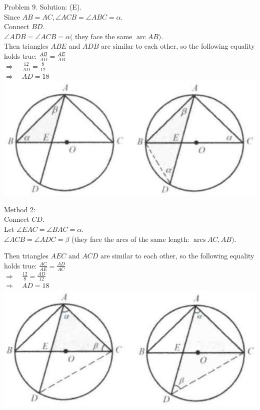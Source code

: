 \documentclass[10pt]{article}
\begin{document}
Problem 9. Solution: (E).\\
Since \(A B=A C, \angle A C B=\angle A B C=\alpha\).\\
Connect \(B D\).\\
\(\angle A D B=\angle A C B=\alpha(\) they face the same \(\operatorname{arc} A B)\).\\
Then triangles \(A B E\) and \(A D B\) are similar to each other, so the following equality holds true: \(\frac{A B}{A D}=\frac{A E}{A B}\)\\
\(\Rightarrow \quad \frac{12}{A D}=\frac{8}{12}\)\\
\(\Rightarrow \quad A D=18\)\\
\includegraphics[max width=\textwidth, center]{2025_04_17_97bc1f7e44d93c271a88g-174}

Method 2:\\
Connect \(C D\).\\
Let \(\angle E A C=\angle B A C=\alpha\).\\
\(\angle A C B=\angle A D C=\beta\) (they face the arcs of the same length: \(\operatorname{arcs} A C, A B)\).

Then triangles \(A E C\) and \(A C D\) are similar to each other, so the following equality holds true: \(\frac{A C}{A E}=\frac{A D}{A C}\)\\
\(\Rightarrow \quad \frac{12}{8}=\frac{A D}{12}\)\\
\(\Rightarrow \quad A D=18\)\\
\includegraphics[max width=\textwidth, center]{2025_04_17_97bc1f7e44d93c271a88g-174(1)}
\end{document}
